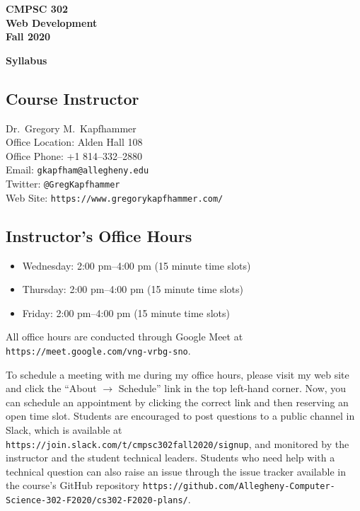 \documentclass[11pt]{article}
\newcommand{\url}[1]{\lstinline{#1}}
\newcommand{\syllabustitle}[1]
{
  \begin{center}
    \begin{center}
      \bf
      CMPSC 302\\Web Development\\
      Fall 2020\\
      \medskip
    \end{center}
    \bf
    #1
  \end{center}
}
\begin{document}
\thispagestyle{empty}

\syllabustitle{Syllabus}

\vspace*{-.15in}

\subsection*{Course Instructor}

Dr.\ Gregory M.\ Kapfhammer\\
\noindent Office Location: Alden Hall 108 \\
\noindent Office Phone: +1 814--332--2880 \\
\noindent Email: \url{gkapfham@allegheny.edu} \\
\noindent Twitter: \url{@GregKapfhammer} \\
\noindent Web Site: \url{https://www.gregorykapfhammer.com/}

\vspace*{-.1in}

\subsection*{Instructor's Office Hours}

\begin{itemize}

  \itemsep0em

  \item Wednesday: 2:00 pm--4:00 pm (15 minute time slots)

  \item Thursday: 2:00 pm--4:00 pm (15 minute time slots)

  \item Friday: 2:00 pm--4:00 pm (15 minute time slots)

\end{itemize}

\vspace*{-.05in}

\noindent All office hours are conducted through Google Meet at
\url{https://meet.google.com/vng-vrbg-sno}.

\noindent To schedule a meeting with me during my office hours, please visit my
web site and click the ``About $\rightarrow$ Schedule'' link in the top
left-hand corner. Now, you can schedule an appointment by clicking the correct
link and then reserving an open time slot. Students are encouraged to post
questions to a public channel in Slack, which is available at
\url{https://join.slack.com/t/cmpsc302fall2020/signup}, and monitored by the
instructor and the student technical leaders. Students who need help with a
technical question can also raise an issue through the issue tracker available
in the course's GitHub repository
\url{https://github.com/Allegheny-Computer-Science-302-F2020/cs302-F2020-plans/}.
\end{document}
